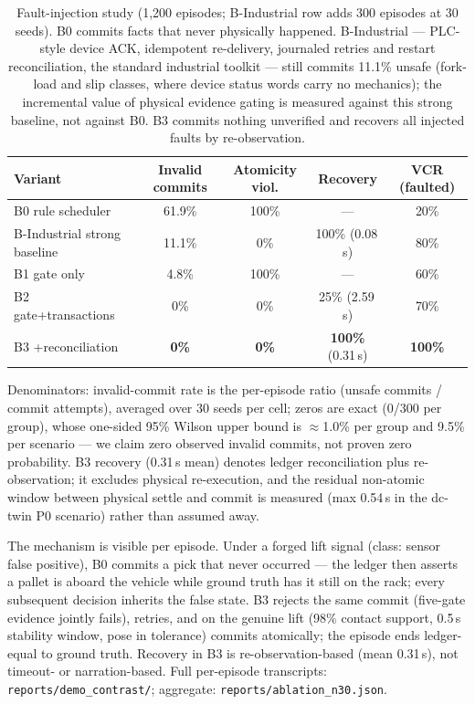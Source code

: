 \documentclass[11pt]{article}
\begin{document}
\begin{table}[h]
\centering\small
\begin{tabular}{lcccc}
\toprule
Variant & Invalid commits & Atomicity viol. & Recovery & VCR (faulted)\\
\midrule
B0 rule scheduler      & 61.9\% & 100\% & ---            & 20\%\\
B-Industrial strong baseline & 11.1\% & 0\% & 100\% (0.08\,s) & 80\%\\
B1 gate only           & 4.8\%  & 100\% & ---            & 60\%\\
B2 gate+transactions   & 0\%    & 0\%   & 25\% (2.59\,s) & 70\%\\
B3 +reconciliation     & \textbf{0\%} & \textbf{0\%} & \textbf{100\%} (0.31\,s) & \textbf{100\%}\\
\bottomrule
\end{tabular}
\caption{Fault-injection study (1{,}200 episodes; B-Industrial row adds
300 episodes at 30 seeds). B0 commits facts that never physically
happened. B-Industrial --- PLC-style device ACK, idempotent re-delivery,
journaled retries and restart reconciliation, the standard industrial
toolkit --- still commits 11.1\% unsafe (fork-load and slip classes,
where device status words carry no mechanics); the incremental value of
physical evidence gating is measured against this strong baseline, not
against B0. B3 commits nothing unverified and recovers all injected
faults by re-observation.}
\label{tab:ablation}
\end{table}

Denominators: invalid-commit rate is the per-episode ratio
(unsafe commits / commit attempts), averaged over 30 seeds per cell;
zeros are exact (0/300 per group), whose one-sided 95\% Wilson upper
bound is \(\approx\)1.0\% per group and 9.5\% per scenario --- we claim
zero observed invalid commits, not proven zero probability. B3 recovery
(0.31\,s mean) denotes ledger reconciliation plus re-observation; it
excludes physical re-execution, and the residual non-atomic window
between physical settle and commit is measured (max 0.54\,s in the
dc-twin P0 scenario) rather than assumed away.

The mechanism is visible per episode. Under a forged lift signal (class:
sensor false positive), B0 commits a pick that never occurred --- the
ledger then asserts a pallet is aboard the vehicle while ground truth has
it still on the rack; every subsequent decision inherits the false state.
B3 rejects the same commit (five-gate evidence jointly fails), retries,
and on the genuine lift (98\% contact support, 0.5\,s stability window,
pose in tolerance) commits atomically; the episode ends ledger-equal to
ground truth. Recovery in B3 is re-observation-based (mean 0.31\,s), not
timeout- or narration-based. Full per-episode transcripts:
\texttt{reports/demo\_contrast/}; aggregate: \texttt{reports/ablation\_n30.json}.
\end{document}
